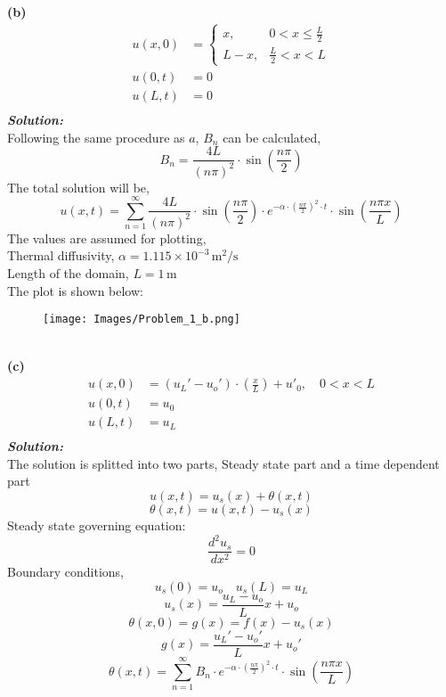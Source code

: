 \documentclass[]{article}
\theoremstyle{definition}
\begin{document}
\begin{enumerate}
\textbf{(b)}\quad
\begin{align*}
u(x,0) &= \begin{cases}
x, & 0 < x \leq \frac{L}{2} \\
L - x, & \frac{L}{2} < x < L
\end{cases} \\
u(0,t) &= 0 \\
u(L,t) &= 0 \\
\end{align*}
\emph{\textbf{Solution:}}\\
Following the same procedure as $a$, $B_n$ can be calculated,
\[
B_n = \frac{4L}{(n\pi)^2} \cdot \sin\left(\frac{n\pi}{2}\right)
\]
The total solution will be,
\[
\boxed{
u(x,t) = \sum_{n=1}^{\infty} \frac{4L}{(n\pi)^2} \cdot \sin\left(\frac{n\pi}{2}\right) \cdot e^{-\alpha \cdot \left(\frac{n\pi}{2}\right)^2 \cdot t} \cdot \sin\left(\frac{n\pi x}{L}\right)
}
\]
The values are assumed for plotting, \\
Thermal diffusivity, $\alpha = 1.115 \times 10^{-3}\, \text{m}^2/\text{s}$ \\
Length of the domain, $L = 1\, \text{m}$ \\
The plot is shown below:\\
\begin{figure}[htbp]
    \centering
    \texttt{[image: Images/Problem\_1\_b.png]}
\end{figure}\\
\textbf{(c)}\quad
\begin{align*}
u(x,0) &= (u_L' - u_o') \cdot \left(\frac{x}{L}\right) + u'_0, \quad 0 < x < L \\
u(0,t) &= u_0 \\
u(L,t) &= u_L \\
\end{align*}
\emph{\textbf{Solution:}}\\
The solution is splitted into two parts, Steady state part and a time dependent part
\[
u(x,t) = u_s(x) + \theta(x,t)
\]
\[
\theta(x,t) = u(x,t) - u_s(x)
\]
Steady state governing equation:
\[
\frac{d^2u_s}{dx^2} = 0
\]
Boundary conditions,
\[
u_s(0) = u_o \quad u_s(L) = u_L
\]
\[
u_s(x) = \frac{u_L - u_o}{L}x + u_o
\]
\[
\theta(x,0) = g(x) = f(x) - u_s(x)
\]
\[
g(x) = \frac{u_L' - u_o'}{L}x + u_o'
\]
\[
\boxed{
\theta(x,t) = \sum_{n=1}^{\infty} B_n \cdot e^{-\alpha \cdot \left(\frac{n\pi}{2}\right)^2 \cdot t} \cdot \sin\left(\frac{n\pi x}{L}\right)
}\]
\end{enumerate}
\end{document}
